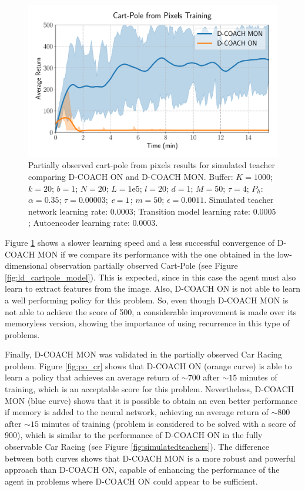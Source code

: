 \begin{figure}[h]
    \centering
    \includegraphics[width=0.7\linewidth]{imagenes/cap3/cartpole_HD_model.pdf}
    \vspace{-0.2cm}
    \caption[Partially observed Cart-Pole from pixels results for simulated teacher comparing D-COACH ON and D-COACH MON.]{Partially observed cart-pole from pixels results for simulated teacher comparing D-COACH ON and D-COACH MON.  Buffer: $K = 1000$; $k=20$; $b = 1$; $N = 20$; $L=1\mathrm{e}5$; $l=20$; $d=1$; $M=50$; $\tau=4$; $P_{h}$: $\alpha = 0.35$; $\tau = 0.00003$; $\emph{e}=1$; $m=50$; $\epsilon=0.0011$. Simulated teacher network learning rate: $0.0003$; Transition model learning rate: $0.0005$; Autoencoder learning rate: $0.0003$.}
    \label{fig:cp_hd}
\end{figure}

Figure \ref{fig:cp_hd} shows a slower learning speed and a less successful convergence of D-COACH MON if we compare its performance with the one obtained in the low-dimensional observation partially observed Cart-Pole (see Figure \ref{fig:ld_cartpole_model}). This is expected, since in this case the agent must also learn to extract features from the image. Also, D-COACH ON is not able to learn a well performing policy for this problem. So, even though D-COACH MON is not able to achieve the score of 500, a considerable improvement is made over its memoryless version, showing the importance of using recurrence in this type of problems.

Finally, D-COACH MON was validated in the partially observed Car Racing problem. Figure \ref{fig:po_cr} shows that D-COACH ON (orange curve) is able to learn a policy that achieves an average return of $\sim700$ after $\sim15$ minutes of training, which is an acceptable score for this problem. Nevertheless, D-COACH MON (blue curve) shows that it is possible to obtain an even better performance if memory is added to the neural network, achieving an average return of $\sim800$ after $\sim15$ minutes of training (problem is considered to be solved with a score of 900), which is similar to the performance of $\text{D-COACH}$ ON in the fully observable Car Racing (see Figure \ref{fig:simulatedteachers}). The difference between both curves shows that D-COACH MON is a more robust and powerful approach than $\text{D-COACH}$ ON, capable of enhancing the performance of the agent in problems where $\text{D-COACH}$ ON could appear to be sufficient.


